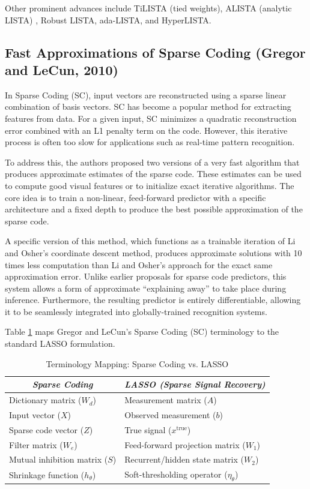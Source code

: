 \documentclass[conference]{IEEEtran}
\begin{document}
Other prominent advances include TiLISTA (tied weights), ALISTA (analytic LISTA) \cite{liu2019alista}, Robust LISTA, ada-LISTA, and HyperLISTA.

\subsection{Fast Approximations of Sparse Coding (Gregor and LeCun, 2010) \texorpdfstring{\cite{gregor2010learning}}{}}

In Sparse Coding (SC), input vectors are reconstructed using a sparse linear combination of basis vectors. SC has become a popular method for extracting features from data. For a given input, SC minimizes a quadratic reconstruction error combined with an L1 penalty term on the code. However, this iterative process is often too slow for applications such as real-time pattern recognition. 

To address this, the authors proposed two versions of a very fast algorithm that produces approximate estimates of the sparse code. These estimates can be used to compute good visual features or to initialize exact iterative algorithms. The core idea is to train a non-linear, feed-forward predictor with a specific architecture and a fixed depth to produce the best possible approximation of the sparse code. 

A specific version of this method, which functions as a trainable iteration of Li and Osher’s coordinate descent method, produces approximate solutions with 10 times less computation than Li and Osher’s approach for the exact same approximation error. Unlike earlier proposals for sparse code predictors, this system allows a form of approximate ``explaining away'' to take place during inference. Furthermore, the resulting predictor is entirely differentiable, allowing it to be seamlessly integrated into globally-trained recognition systems.

Table \ref{tab:sc_vs_lasso} maps Gregor and LeCun's Sparse Coding (SC) terminology to the standard LASSO formulation.

\begin{table}[htbp]
\caption{Terminology Mapping: Sparse Coding vs. LASSO}
\centering
\begin{tabular}{|l|l|}
\hline
\multicolumn{1}{|c|}{\textit{Sparse Coding}} & \multicolumn{1}{c|}{\textit{LASSO (Sparse Signal Recovery)}} \\ \hline
Dictionary matrix ($W_d$) & Measurement matrix ($A$) \\ \hline
Input vector ($X$) & Observed measurement ($b$) \\ \hline
Sparse code vector ($Z$) & True signal ($x^{\text{true}}$) \\ \hline
Filter matrix ($W_e$) & Feed-forward projection matrix ($W_1$) \\ \hline
Mutual inhibition matrix ($S$) & Recurrent/hidden state matrix ($W_2$) \\ \hline
Shrinkage function ($h_\theta$) & Soft-thresholding operator ($\eta_\theta$) \\ \hline
\end{tabular}
\label{tab:sc_vs_lasso}
\end{table}
\end{document}
